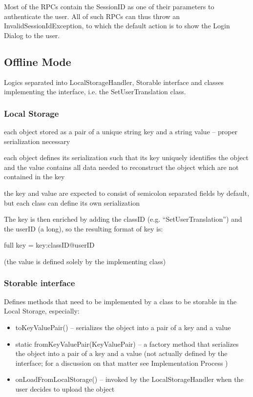 Most of the RPCs contain the SessionID as one of their parameters to authenticate the user. All of such RPCs can thus throw an InvalidSessionIdException, to which the default action is to show the Login Dialog to the user.

\subsection{Offline Mode}


Logics separated into LocalStorageHandler, Storable interface and classes implementing the interface, i.e. the SetUserTranslation class.

\subsubsection{Local Storage}


each object stored as a pair of a unique string key and a string value -- proper serialization necessary

each object defines its serialization such that its key uniquely identifies the object and the value contains all data needed to reconstruct the object which are not contained in the key

the key and value are expected to consist of semicolon separated fields by default, but each class can define its own serialization

The key is then enriched by adding the classID (e.g. ``SetUserTranslation'') and the userID (a long),
so the resulting format of key is:

full key = key:classID@userID


(the value is defined solely by the implementing class)

\subsubsection{Storable interface}

Defines methods that need to be implemented by a class to be storable in the Local Storage, especially:

\begin{itemize}
\item toKeyValuePair() -- serializes the object into a pair of a key and a value

\item static fromKeyValuePair(KeyValuePair) -- a factory method that serializes the object into a pair of a key and a value (not actually defined by the interface;  for a discussion on that matter see Implementation Process )

\item onLoadFromLocalStorage() -- invoked by the LocalStorageHandler when the user decides to upload the object
\end{itemize}

